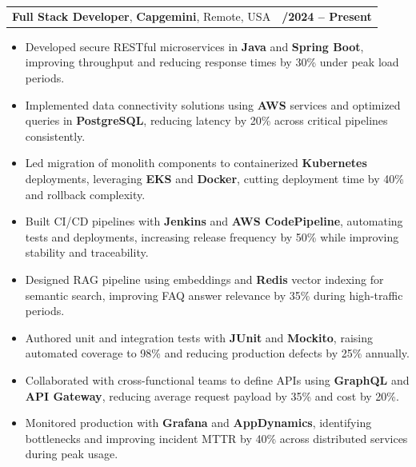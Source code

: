 \documentclass[letterpaper,11pt]{article}
\makeatletter
\newcommand{\resumeItem}[1]{
  \item\footnotesize{
    {#1 \vspace{-2pt}}
  }
}
\newcommand{\resumeSubheading}[4]{
  \vspace{-2pt}\item
    \begin{tabular*}{1.0\textwidth}[t]{l@{\extracolsep{\fill}}r}
      \textbf{\fontsize{10pt}{14pt}\selectfont #3}, \textbf{\fontsize{10pt}{14pt}\selectfont #1}, \fontsize{10pt}{14pt}\selectfont #4 & \textbf{\fontsize{10pt}{14pt}\selectfont #2} \\
    \end{tabular*}\vspace{-7pt}
}
\newcommand{\resumeItemListStart}{\begin{itemize}[leftmargin=*]}
\newcommand{\resumeItemListEnd}{\end{itemize}\vspace{-5pt}}
\makeatother
\begin{document}
    \resumeSubheading
        {Capgemini}{01/2024 -- Present}
        {Full Stack Developer}{Remote, USA}
      \resumeItemListStart
        \resumeItem{Developed secure RESTful microservices in \textbf{Java} and \textbf{Spring Boot}, improving throughput and reducing response times by 30\% under peak load periods.}
        \resumeItem{Implemented data connectivity solutions using \textbf{AWS} services and optimized queries in \textbf{PostgreSQL}, reducing latency by 20\% across critical pipelines consistently.}
        \resumeItem{Led migration of monolith components to containerized \textbf{Kubernetes} deployments, leveraging \textbf{EKS} and \textbf{Docker}, cutting deployment time by 40\% and rollback complexity.}
        \resumeItem{Built CI/CD pipelines with \textbf{Jenkins} and \textbf{AWS CodePipeline}, automating tests and deployments, increasing release frequency by 50\% while improving stability and traceability.}
        \resumeItem{Designed RAG pipeline using embeddings and \textbf{Redis} vector indexing for semantic search, improving FAQ answer relevance by 35\% during high-traffic periods.}
        \resumeItem{Authored unit and integration tests with \textbf{JUnit} and \textbf{Mockito}, raising automated coverage to 98\% and reducing production defects by 25\% annually.}
        \resumeItem{Collaborated with cross-functional teams to define APIs using \textbf{GraphQL} and \textbf{API Gateway}, reducing average request payload by 35\% and cost by 20\%.}
        \resumeItem{Monitored production with \textbf{Grafana} and \textbf{AppDynamics}, identifying bottlenecks and improving incident MTTR by 40\% across distributed services during peak usage.}
      \resumeItemListEnd
\end{document}
